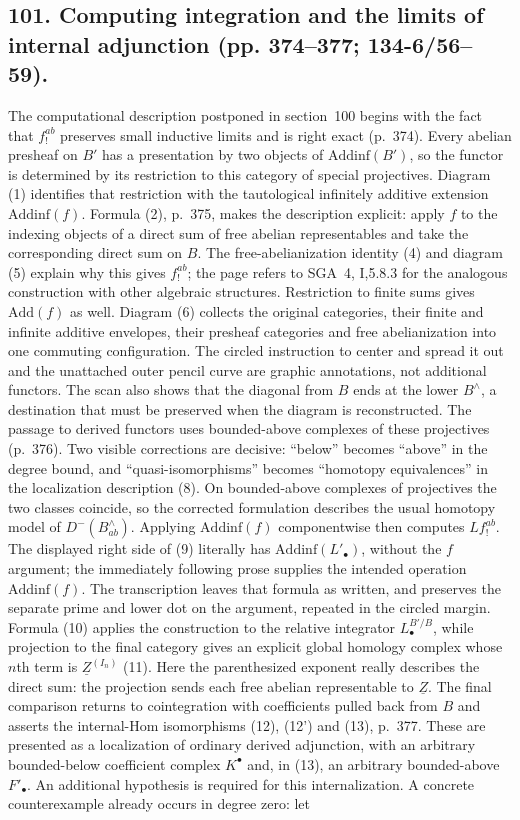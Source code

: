\documentclass[10pt,oneside]{book}
\begin{document}
\subsection*{101. Computing integration and the limits of internal adjunction (pp. 374--377; 134-6/56--59).}
The computational description postponed in section~100 begins with the fact that $f_!^{ab}$ preserves small inductive limits and is right exact (p.~374). Every abelian presheaf on $B'$ has a presentation by two objects of $\mathrm{Addinf}(B')$, so the functor is determined by its restriction to this category of special projectives. Diagram (1) identifies that restriction with the tautological infinitely additive extension $\mathrm{Addinf}(f)$. Formula (2), p.~375, makes the description explicit: apply $f$ to the indexing objects of a direct sum of free abelian representables and take the corresponding direct sum on $B$. The free-abelianization identity (4) and diagram (5) explain why this gives $f_!^{ab}$; the page refers to SGA~4, I,5.8.3 for the analogous construction with other algebraic structures. Restriction to finite sums gives $\mathrm{Add}(f)$ as well. Diagram (6) collects the original categories, their finite and infinite additive envelopes, their presheaf categories and free abelianization into one commuting configuration. The circled instruction to center and spread it out and the unattached outer pencil curve are graphic annotations, not additional functors. The scan also shows that the diagonal from $B$ ends at the lower $B^{\wedge}$, a destination that must be preserved when the diagram is reconstructed. The passage to derived functors uses bounded-above complexes of these projectives (p.~376). Two visible corrections are decisive: ``below'' becomes ``above'' in the degree bound, and ``quasi-isomorphisms'' becomes ``homotopy equivalences'' in the localization description (8). On bounded-above complexes of projectives the two classes coincide, so the corrected formulation describes the usual homotopy model of $D^-(B^{\wedge}_{ab})$. Applying $\mathrm{Addinf}(f)$ componentwise then computes $Lf_!^{ab}$. The displayed right side of (9) literally has $\mathrm{Addinf}(L'_{\bullet})$, without the $f$ argument; the immediately following prose supplies the intended operation $\mathrm{Addinf}(f)$. The transcription leaves that formula as written, and preserves the separate prime and lower dot on the argument, repeated in the circled margin. Formula (10) applies the construction to the relative integrator $L^{B'/B}_{\bullet}$, while projection to the final category gives an explicit global homology complex whose $n$th term is $\underline Z^{(I_n)}$ (11). Here the parenthesized exponent really describes the direct sum: the projection sends each free abelian representable to $\underline Z$. The final comparison returns to cointegration with coefficients pulled back from $B$ and asserts the internal-Hom isomorphisms (12), (12') and (13), p.~377. These are presented as a localization of ordinary derived adjunction, with an arbitrary bounded-below coefficient complex $K^{\bullet}$ and, in (13), an arbitrary bounded-above $F'_{\bullet}$. An additional hypothesis is required for this internalization. A concrete counterexample already occurs in degree zero: let 
\end{document}
